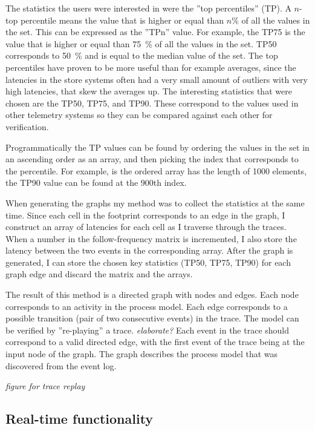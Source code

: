 \documentclass[english,12pt,a4paper,pdftex,sci,utf8]{aaltothesis}
\theoremstyle{definition}
\newcommand{\nyi}[1]{\noindent\colorbox{nyibg}{\textcolor{nyitext}{\emph{#1}}}}
\begin{document}
The statistics the users were interested in were the ''top percentiles'' (TP).
A $n$-top percentile means the value that is higher or equal than $n\%$ of all the values in the set.
This can be expressed as the ''TPn'' value.
For example, the TP75 is the value that is higher or equal than 75~\% of all the values in the set.
TP50 corresponds to 50~\% and is equal to the median value of the set.
The top percentiles have proven to be more useful than for example averages, since the latencies 
in the store systems often had a very small amount of outliers with very high latencies, that skew the 
averages up.
The interesting statistics that were chosen are the TP50, TP75, and TP90. 
These correspond to the values used in other telemetry systems so they can be compared against each other for verification.

Programmatically the TP values can be found by ordering the values in the set in an ascending order as an array, and then picking the index that corresponds to the percentile. For example, is the ordered array has the length of 1000 elements, the TP90 value can be found at the 900th index.

When generating the graphs my method was to collect the statistics at the same time.
Since each cell in the footprint corresponds to an edge in the graph, I construct an array of latencies for each cell as I traverse through the traces.
When a number in the follow-frequency matrix is incremented, I also store the latency between the two events in the corresponding array. 
After the graph is generated, I can store the chosen key statistics (TP50, TP75, TP90) for each graph edge and discard the matrix and the arrays.

The result of this method is a directed graph with nodes and edges.
Each node corresponds to an activity in the process model.
Each edge corresponds to a possible transition (pair of two consecutive events) in the trace.
The model can be verified by ''re-playing'' a trace. \nyi{elaborate?}
Each event in the trace should correspond to a valid directed edge, with the first event of the trace being at the input node of the graph.
The graph describes the process model that was discovered from the event log.

\nyi{figure for trace replay}

\subsection{Real-time functionality}
\end{document}
